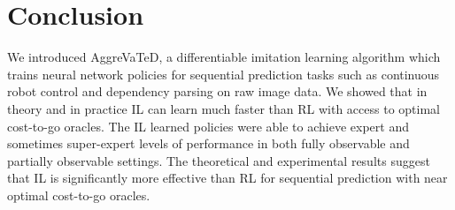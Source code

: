 \documentclass{article}
\begin{document}
\vspace{-5pt}
\section{Conclusion}
We introduced AggreVaTeD, a differentiable imitation learning algorithm which trains neural network policies for sequential prediction tasks such as continuous robot control and dependency parsing on raw image data. We showed that in theory and in practice IL can learn much faster than RL with access to optimal cost-to-go oracles. The IL learned policies were able to achieve expert and sometimes super-expert levels of performance in both fully observable and partially observable settings. The theoretical and experimental results suggest that IL is significantly more effective than RL for sequential prediction with near optimal cost-to-go oracles.




\end{document}
